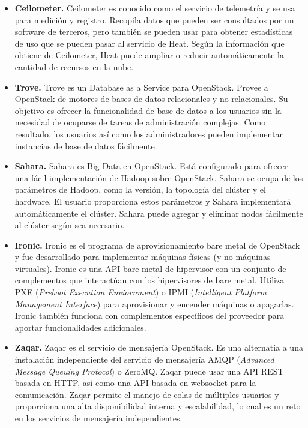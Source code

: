 \begin{itemize}
\item \textbf{Ceilometer.} Ceilometer es conocido como el servicio de telemetría y se usa para medición y registro. Recopila datos que pueden ser consultados por un software de terceros, pero también se pueden usar para obtener estadísticas de uso que se pueden pasar al servicio de Heat. Según la información que obtiene de Ceilometer, Heat puede ampliar o reducir automáticamente la cantidad de recursos en la nube.\cite{noauthor_celiometer_nodate}

\item\textbf{Trove.} Trove es un Database as a Service para OpenStack. Provee a OpenStack de motores de bases de datos relacionales y no relacionales. Su objetivo es ofrecer la funcionalidad de base de datos a los usuarios sin la necesidad de ocuparse de tareas de administración complejas. Como resultado, los usuarios así como los administradores pueden implementar instancias de base de datos fácilmente.\cite{noauthor_trove_nodate}

\item \textbf{Sahara.} Sahara es Big Data en OpenStack. Está configurado para ofrecer una fácil implementación de Hadoop sobre OpenStack. Sahara se ocupa de los parámetros de Hadoop, como la versión, la topología del clúster y el hardware. El usuario proporciona estos parámetros y Sahara implementará automáticamente el clúster. Sahara puede agregar y eliminar nodos fácilmente al clúster según sea necesario.\cite{noauthor_sahara_nodate}

\item \textbf{Ironic.} Ironic es el programa de aprovisionamiento  bare metal de OpenStack y fue desarrollado para implementar máquinas físicas (y no máquinas virtuales). Ironic es una API bare metal de hipervisor con un conjunto de complementos que interactúan con los hipervisores de bare metal. Utiliza PXE (\textit{Preboot Execution Enviornment}) o IPMI (\textit{Intelligent Platform Management Interface}) para aprovisionar y encender máquinas o apagarlas. Ironic también funciona con complementos específicos del proveedor para aportar funcionalidades adicionales.\cite{noauthor_ironic_nodate}


\item \textbf{Zaqar.} Zaqar es el servicio de mensajería OpenStack. Es una alternatia a una instalación independiente del servicio de mensajería AMQP (\textit{Advanced Message Queuing Protocol}) o ZeroMQ. Zaqar puede usar una API REST basada en HTTP, así como una API basada en websocket para la comunicación. Zaqar permite el manejo de colas de múltiples usuarios y proporciona una alta disponibilidad interna y escalabilidad, lo cual es un reto en los servicios de mensajería independientes.\cite{noauthor_zaqar_nodate}


\end{itemize}

